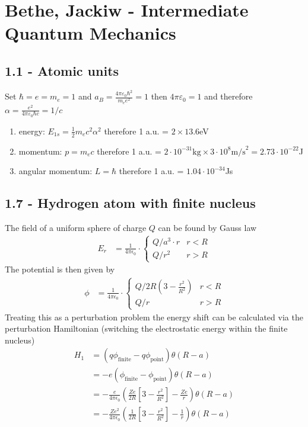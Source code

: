 \documentclass[10pt,a4paper]{book}
\theoremstyle{definition}
\begin{document}
\section{{\sc Bethe, Jackiw} - Intermediate Quantum Mechanics}
\subsection{1.1 - Atomic units}
Set $\hbar=e=m_e=1$ and $a_B=\frac{4\pi\varepsilon_0\hbar^2}{m_ee^2}=1$ then $4\pi\varepsilon_0=1$ and therefore $\alpha=\frac{e^2}{4\pi\varepsilon_0\hbar c}=1/c$
\begin{enumerate}
\item energy: $E_{1s}=\frac{1}{2}m_ec^2\alpha^2$ therefore 1 a.u. = $2\times13.6$eV
\item momentum: $p=m_e c$ therefore 1 a.u. = $2\cdot 10^{-31}\text{kg}\times 3\cdot 10^8\text{m/s}^2=2.73\cdot10^{-22}$J
\item angular momentum: $L=\hbar$ therefore 1 a.u. = $1.04\cdot10^{-34}$Js 
\end{enumerate}

\subsection{1.7 - Hydrogen atom with finite nucleus}
The field of a uniform sphere of charge $Q$ can be found by Gauss law
\begin{align}
E_r&=\frac{1}{4\pi\epsilon_0}\cdot\left\{
\begin{array}{ll}
Q/a^3\cdot r & r<R\\
Q/r^2 & r>R
\end{array}
\right.
\end{align}
The potential is then given by
\begin{align}
\phi&=\frac{1}{4\pi\epsilon_0}\cdot\left\{
\begin{array}{ll}
Q/2R\left(3-\frac{r^2}{R^2}\right) & r<R\\
Q/r & r>R
\end{array}
\right.
\end{align}
Treating this as a perturbation problem the energy shift can be calculated via the perturbation Hamiltonian (switching the electrostatic energy within the finite nucleus)
\begin{align}
H_1
&=(q\phi_\text{finite}-q\phi_\text{point})\theta(R-a)\\
&=-e\left(\phi_\text{finite}-\phi_\text{point}\right)\theta(R-a)\\
&=-\frac{e}{4\pi\epsilon_0}\left(\frac{Ze}{2R}
\left[3-\frac{r^2}{R^2}\right]-\frac{Ze}{r}\right)\theta(R-a)\\
&=-\frac{Ze^2}{4\pi\epsilon_0}\left(\frac{1}{2R}
\left[3-\frac{r^2}{R^2}\right]-\frac{1}{r}\right)\theta(R-a)\\
\end{align}
\end{document}
